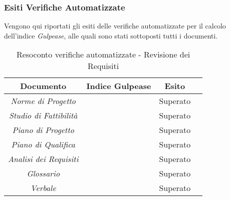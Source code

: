 \subsubsection{Esiti Verifiche Automatizzate}
Vengono qui riportati gli esiti delle verifiche automatizzate per il calcolo dell'indice \textit{Gulpease}, alle quali sono stati sottoposti tutti i documenti.
\begin{table}[h]
\begin{center}
\begin{tabular}{|c|c|c|c|}
\hline Documento & Indice Gulpease & Esito\\
\hline
\emph{Norme di Progetto} &  & Superato \\
\emph{Studio di Fattibilità} &  & Superato \\
\emph{Piano di Progetto} &  & Superato \\
\emph{Piano di Qualifica} &   & Superato \\
\emph{Analisi dei Requisiti} &  & Superato \\
\emph{Glossario} &  & Superato \\
\emph{Verbale} &  & Superato \\
\hline
\end{tabular}
\caption{Resoconto verifiche automatizzate - Revisione dei Requisiti}
\end{center}
\end{table}